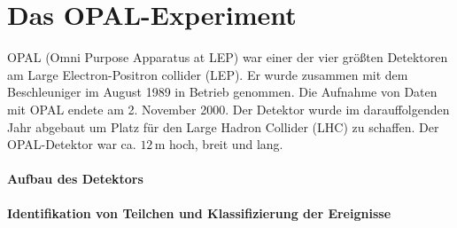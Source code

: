 \section{Das OPAL-Experiment}

OPAL (Omni Purpose Apparatus at LEP) war einer der vier größten Detektoren am Large Electron-Positron collider (LEP). Er wurde zusammen mit dem Beschleuniger im August 1989 in Betrieb genommen. Die Aufnahme von Daten mit OPAL endete am 2. November 2000. Der Detektor wurde im darauffolgenden Jahr abgebaut um Platz für den Large Hadron Collider (LHC) zu schaffen.
Der OPAL-Detektor war ca. $12\,\mathrm{m}$ hoch, breit und lang.\\


 

\paragraph{Aufbau des Detektors}

\paragraph{Identifikation von Teilchen und Klassifizierung der Ereignisse}